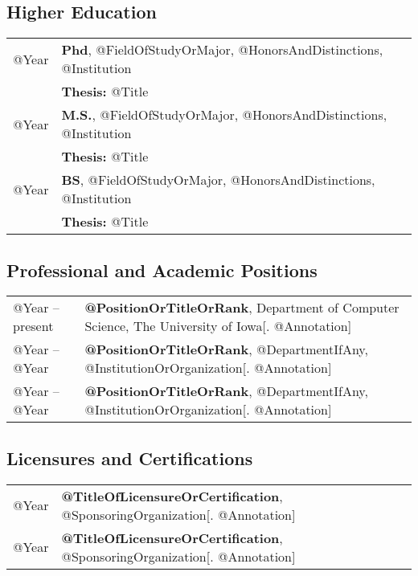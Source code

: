 \documentclass[10pt]{article}
\begin{document}
\subsection*{Higher Education}
\smallskip

\quad
\begin{tabular}{l@{\quad\ }p{40em}}
 @Year  
 & {\bf Phd}, @FieldOfStudyOrMajor, @HonorsAndDistinctions, @Institution \\
 & {\bf Thesis:} @Title
 \\[.5ex]
 @Year  
 & {\bf M.S.}, @FieldOfStudyOrMajor, @HonorsAndDistinctions, @Institution \\
 & {\bf Thesis:} @Title
 \\[.5ex]
 @Year  
 & {\bf BS}, @FieldOfStudyOrMajor, @HonorsAndDistinctions, @Institution \\
 & {\bf Thesis:} @Title
 \\[.5ex]
\end{tabular}


\subsection*{Professional and Academic Positions}
\smallskip

\quad
\begin{tabular}{l@{\quad\ }p{35em}}
 @Year -- present
 & {\bf @PositionOrTitleOrRank}, Department of Computer Science, 
   The University of Iowa[. @Annotation]
 \\[3.5ex]
 @Year -- @Year
 & {\bf @PositionOrTitleOrRank}, @DepartmentIfAny, 
   @InstitutionOrOrganization[. @Annotation]
 \\[3.5ex]
 @Year -- @Year
 & {\bf @PositionOrTitleOrRank}, @DepartmentIfAny, 
   @InstitutionOrOrganization[. @Annotation]
 \\[3.5ex]
\end{tabular}


\subsection*{Licensures and Certifications}
\smallskip

\quad
\begin{tabular}{l@{\quad\ }l}
 @Year
 & {\bf @TitleOfLicensureOrCertification}, @SponsoringOrganization[. @Annotation]
 \\[.5ex]
 @Year  
 & {\bf @TitleOfLicensureOrCertification}, @SponsoringOrganization[. @Annotation]
 \\[.5ex]
\end{tabular}
\end{document}
